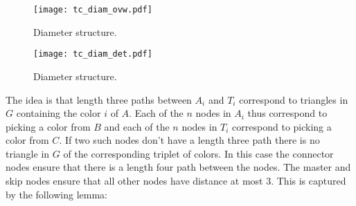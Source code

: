 \documentclass[a4paper,11pt]{article}
\theoremstyle{definition}
\begin{document}
\begin{figure}[htbp]
    \centering
    \texttt{[image: tc\_diam\_ovw.pdf]}
    \caption{Diameter structure.}
    \label{fig:34diam}
\end{figure}
\begin{figure}[htbp]
    \centering
    \texttt{[image: tc\_diam\_det.pdf]}
    \caption{Diameter structure.}
    \label{fig:tc_diam_det}
\end{figure}

The idea is that length three paths between $A_i$ and $T_i$ correspond to
triangles in $G$ containing the color $i$ of $A$. Each of the $n$ nodes in
$A_i$ thus correspond to picking a color from $B$ and each of the $n$ nodes in
$T_i$ correspond to picking a color from $C$. If two such nodes don't have a
length three path there is no triangle in $G$ of the corresponding triplet of
colors. In this case the connector nodes ensure that there is a length four
path between the nodes. The master and skip nodes ensure that all other nodes
have distance at most $3$. This is captured by the following lemma:
\end{document}
